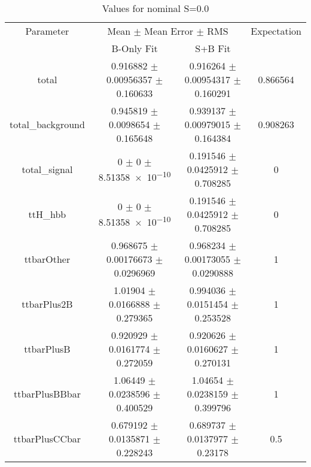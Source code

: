 \begin{table}
\centering
\caption{Values for nominal S=0.0}
\begin{tabular}{cccc}
\toprule
Parameter & \multicolumn{2}{c}{Mean $\pm$ Mean Error $\pm$ RMS} & Expectation\\
 & B-Only Fit & S+B Fit & \\
\midrule
total & \num{0.916882} $\pm$ \num{0.00956357} $\pm$ \num{0.160633} & \num{0.916264} $\pm$ \num{0.00954317} $\pm$ \num{0.160291} & \num{0.866564}\\
total\_background & \num{0.945819} $\pm$ \num{0.0098654} $\pm$ \num{0.165648} & \num{0.939137} $\pm$ \num{0.00979015} $\pm$ \num{0.164384} & \num{0.908263}\\
total\_signal & \num{0} $\pm$ \num{0} $\pm$ \num{8.51358e-10} & \num{0.191546} $\pm$ \num{0.0425912} $\pm$ \num{0.708285} & \num{0}\\
ttH\_hbb & \num{0} $\pm$ \num{0} $\pm$ \num{8.51358e-10} & \num{0.191546} $\pm$ \num{0.0425912} $\pm$ \num{0.708285} & \num{0}\\
ttbarOther & \num{0.968675} $\pm$ \num{0.00176673} $\pm$ \num{0.0296969} & \num{0.968234} $\pm$ \num{0.00173055} $\pm$ \num{0.0290888} & \num{1}\\
ttbarPlus2B & \num{1.01904} $\pm$ \num{0.0166888} $\pm$ \num{0.279365} & \num{0.994036} $\pm$ \num{0.0151454} $\pm$ \num{0.253528} & \num{1}\\
ttbarPlusB & \num{0.920929} $\pm$ \num{0.0161774} $\pm$ \num{0.272059} & \num{0.920626} $\pm$ \num{0.0160627} $\pm$ \num{0.270131} & \num{1}\\
ttbarPlusBBbar & \num{1.06449} $\pm$ \num{0.0238596} $\pm$ \num{0.400529} & \num{1.04654} $\pm$ \num{0.0238159} $\pm$ \num{0.399796} & \num{1}\\
ttbarPlusCCbar & \num{0.679192} $\pm$ \num{0.0135871} $\pm$ \num{0.228243} & \num{0.689737} $\pm$ \num{0.0137977} $\pm$ \num{0.23178} & \num{0.5}\\
\bottomrule
\end{tabular}
\end{table}